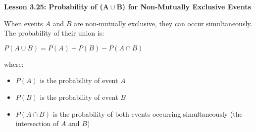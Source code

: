 \begin{center}
\textbf{Lesson 3.25: Probability of (\(\mathbf{A \cup B}\)) for Non-Mutually Exclusive Events}
\end{center}

\vspace*{-1.5ex}

When events \( A \) and \( B \) are non-mutually exclusive, they can occur simultaneously. The probability of their union is:

{\centering $ P(A \cup B) = P(A) + P(B) - P(A \cap B) $\par}

\noindent where:
\begin{itemize}
    \item \( P(A) \) is the probability of event \( A \)
    \item \( P(B) \) is the probability of event \( B \)
    \item \( P(A \cap B) \) is the probability of both events occurring simultaneously (the intersection of \( A \) and \( B \))
\end{itemize}
